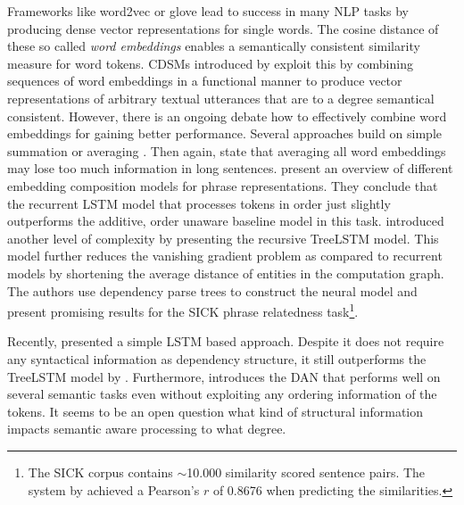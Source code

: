 Frameworks like word2vec \autocite{mikolov_distributed_2013} or glove \autocite{pennington_glove_2014} lead to success in many \ac{NLP} tasks by producing dense vector representations for single words. The cosine distance of these so called \textit{word embeddings} enables a semantically consistent similarity measure for word tokens. \acp{CDSM} introduced by \textcite{clark_compositional_2008} exploit this by combining sequences of word embeddings in a functional manner to produce vector representations of arbitrary textual utterances that are to a degree semantical consistent. However, there is an ongoing debate how to effectively combine word embeddings for gaining better performance. Several approaches build on simple summation or averaging \autocite{habernal_exploiting_2015,boltuzic_identifying_2015,misra_measuring_2016}. Then again, \Textcite{misra_measuring_2016} state that averaging all word embeddings may lose too much information in long sentences. \Textcite{wang_comparison_2017} present an overview of different embedding composition models for phrase representations. They conclude that the recurrent \ac{LSTM} model \autocite{hochreiter_long_1997} that processes tokens in order just slightly outperforms the additive, order unaware baseline model in this task. \Textcite{tai_improved_2015} introduced another level of complexity by presenting the recursive TreeLSTM model. This model further reduces the vanishing gradient problem as compared to recurrent models by shortening the average distance of entities in the computation graph. The authors use dependency parse trees to construct the neural model and present promising results for the SICK phrase relatedness task\footnote{The SICK corpus \autocite{marelli_sick_2014} contains $\sim$10.000 similarity scored sentence pairs. The system by \Textcite{tai_improved_2015} achieved a Pearson's $r$ of 0.8676 when predicting the similarities.}. 

Recently, \Textcite{mueller_siamese_2016} presented a simple \ac{LSTM} based approach. Despite it does not require any syntactical information as dependency structure, it still outperforms the TreeLSTM model by \textcite{tai_improved_2015}. Furthermore, \Textcite{iyyer_deep_2015} introduces the \ac{DAN} that performs well on several semantic tasks even without exploiting any ordering information of the tokens. It seems to be an open question what kind of structural information impacts semantic aware processing to what degree.




